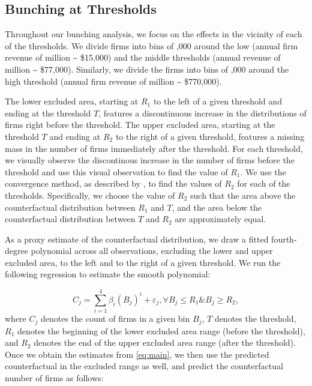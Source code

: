 \subsection{Bunching at Thresholds}
\label{subsec:3-methodology-bunching}
Throughout our bunching analysis, we focus on the effects in the vicinity of each of the thresholds. We divide firms into bins of ,000 around the low (annual firm revenue of  million \textasciitilde{} \$15,000) and the middle thresholds (annual revenue of  million \textasciitilde{} \$77,000). Similarly, we divide the firms into bins of ,000 around the high threshold (annual firm revenue of  million \textasciitilde{} \$770,000). 

The lower excluded area, starting at $R_{1}$ to the left of a given threshold and ending at the threshold $T$, features a discontinuous
increase in the distributions of firms right before the threshold. The upper excluded area, starting at the threshold $T$ and ending
at $R_{2}$ to the right of a given threshold, features a missing mass in the number of firms immediately after the threshold. For each
threshold, we visually observe the discontinous increase in the number of firms before the threshold and use this visual observation to find the value of $R_{1}$. We use the convergence method, as described by \citet{kleven2013using}, to find the values of $R_{2}$ for each of the thresholds. Specifically, we choose the value of $R_{2}$ such that the area above the counterfactual distribution between $R_{1}$ and $T$, and the area below the counterfactual distribution between $T$ and $R_{2}$ are approximately equal.

As a proxy estimate of the counterfactual distribution, we draw a fitted fourth-degree polynomial across all observations, excluding
the lower and upper excluded area, to the left and to the right of a given threshold. We run the following regression to estimate the
smooth polynomial: 

\begin{equation}
  \label{eq:main}  
  C_{j}=\sum_{i=1}^{4}\beta_{i}(B_{j})^{i}+\varepsilon_{j},\forall B_{j}\leq R_{1}\&B_{j}\geq R_{2},
\end{equation}
where $C_{j}$ denotes the count of firms in a given bin $B_{j}$, $T$ denotes the threshold, $R_{1}$ denotes the beginning of the lower excluded area range (before the threshold), and $R_{2}$ denotes the end of the upper excluded area range (after the threshold). Once we obtain the estimates from \cref{eq:main}, we then use the predicted counterfactual in the excluded range as well, and predict the counterfactual number of firms as follows:

